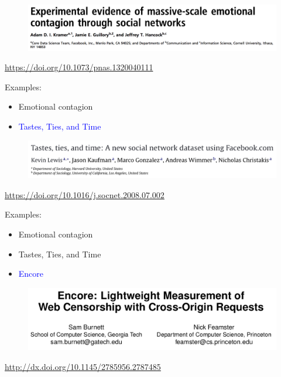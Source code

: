 \documentclass{beamer}
\begin{document}
\begin{frame}

\begin{figure}
\includegraphics[width=\textwidth]{figures/kramer_experimental_2014_title}
\end{figure}

\vfill
\url{https://doi.org/10.1073/pnas.1320040111}
\end{frame}
\begin{frame}

Examples:
\begin{itemize}
\item Emotional contagion
\item \textcolor{blue}{Tastes, Ties, and Time}
\end{itemize}

\end{frame}
\begin{frame}

\begin{figure}
\includegraphics[width=\textwidth]{figures/lewis_tastes_2008_title}
\end{figure}

\vfill
\url{https://doi.org/10.1016/j.socnet.2008.07.002}

\end{frame}
\begin{frame}

Examples:
\begin{itemize}
\item Emotional contagion
\item Tastes, Ties, and Time
\item \textcolor{blue}{Encore}
\end{itemize}

\end{frame}
\begin{frame}

\begin{figure}
\includegraphics[width=\textwidth]{figures/burnett_encore_2015_title}
\end{figure}

\vfill
\url{http://dx.doi.org/10.1145/2785956.2787485}

\end{frame}
\end{document}
